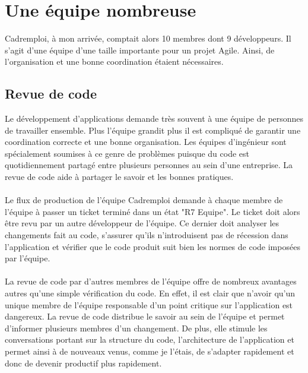 \section{Une équipe nombreuse}
\label{sec:Une équipe nombreuse}
Cadremploi, à mon arrivée, comptait alors 10 membres dont 9 développeurs.
Il s'agit d'une équipe d'une taille importante pour un projet Agile.
Ainsi, de l'organisation et une bonne coordination étaient nécessaires.

\subsection{Revue de code}
\label{sub:Revue de code}
Le développement d'applications demande très souvent à une équipe de personnes de travailler ensemble.
Plus l'équipe grandit plus il est compliqué de garantir une coordination correcte et une bonne organisation.
Les équipes d'ingénieur sont spécialement soumises à ce genre de problèmes puisque du code est quotidiennement partagé entre plusieurs personnes au sein d'une entreprise.
La revue de code aide à partager le savoir et les bonnes pratiques.
\paragraph{}
Le flux de production de l'équipe Cadremploi demande à chaque membre de l'équipe à passer un ticket terminé dans un état "R7 Equipe".
Le ticket doit alors être revu par un autre développeur de l'équipe.
Ce dernier doit analyser les changements fait au code, s'assurer qu'ils n'introduisent pas de récession dans l'application et vérifier que le code produit suit bien les normes de code imposées par l'équipe.
\paragraph{}
La revue de code par d'autres membres de l'équipe offre de nombreux avantages autres qu'une simple vérification du code.
En effet, il est clair que n'avoir qu'un unique membre de l'équipe responsable d'un point critique sur l'application est dangereux.
La revue de code distribue le savoir au sein de l'équipe et permet d'informer plusieurs membres d'un changement.
De plus, elle stimule les conversations portant sur la structure du code, l'architecture de l'application et permet ainsi à de nouveaux venus, comme je l'étais, de s'adapter rapidement et donc de devenir productif plus rapidement.
